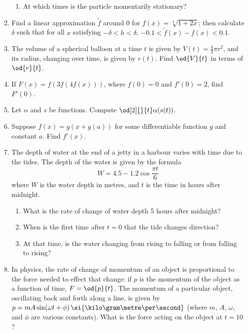 \begin{enumerate}
\begin{enumerate}
      \item At which times is the particle momentarily stationary?
    \end{enumerate}
  \item Find a linear approximation $ \tilde f $ around 0 for $ f(x) = \sqrt[4]{1 + 2x} $; then calculate $ \delta $ such that
        for all $ x $ satisfying $ -\delta < h < \delta $, $ -0.1 < \tilde f(x) - f(x) < 0.1 $.
  \item The volume of a spherical balloon at a time $ t $ is given by $ V(t) = \frac{4}{3} \pi r^2 $, and its radius, changing
        over time, is given by $ r(t) $. Find $ \od{V}{t} $ in terms of $ \od{r}{t} $.
  \item If $ F(x) = f(3f(4f(x))) $, where $ f(0) = 0 $ and $ f'(0) = 2 $, find $ F'(0) $.
  \item Let $ \alpha $ and $ s $ be functions. Compute $ \od[2]{}{t} \alpha(s(t)) $.
  \item Suppose $ f(x) = g(x + g(a)) $ for some differentiable function $ g $ and constant $ a $. Find $ f'(x) $.
  \item The depth of water at the end of a jetty in a harbour varies with time due to the tides. The depth
        of the water is given by the formula
        \begin{displaymath}
          W = 4.5 - 1.2 \cos \frac{\pi t}{6}
        \end{displaymath}
        where $ W $ is the water depth in metres, and $ t $ is the time in hours after midnight.
    \begin{enumerate}
      \item What is the rate of change of water depth 5 hours after midnight?
      \item When is the first time after $ t = 0 $ that the tide changes direction?
      \item At that time, is the water changing from rising to falling or from falling to rising?
    \end{enumerate}
  \item In physics, the rate of change of momentum of an object is proportional to the force needed to effect
        that change: if $ p $ is the momentum of the object as a function of time, $ F = \od{p}{t} $. The momentum
        of a particular object, oscillating back and forth along a line, is given by $ p = mA\sin(\omega t + \phi)\thinspace\si{\kilo\gram\metre\per\second} $
        (where $ m $, $ A $, $ \omega $, and $ \phi $ are various constants). What is the force acting on the object at $ t = 10 $?

\end{enumerate}

